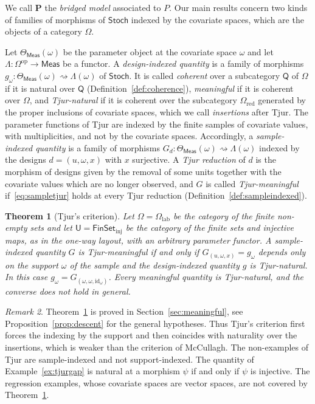 \documentclass[11pt,a4paper]{article}
\theoremstyle{plain}
\newtheorem{theorem}{Theorem}[section]
\theoremstyle{definition}
\theoremstyle{remark}
\newtheorem{remark}[theorem]{Remark}
\newcommand{\cat}[1]{\mathsf{#1}}
\newcommand{\catU}{\cat{U}}
\newcommand{\catO}{\cat{\Omega}}
\newcommand{\Meas}{\cat{Meas}}
\newcommand{\Stoch}{\cat{Stoch}}
\newcommand{\FinSet}{\cat{FinSet}}
\newcommand{\op}{\mathrm{op}}
\newcommand{\id}{\mathrm{id}}
\begin{document}
We call $\mathbf{P}$ the \emph{bridged model} associated to $P$. Our main
results concern two kinds of families of morphisms of $\Stoch$ indexed by the
covariate spaces, which are the objects of a category $\catO$.

Let $\Theta_\Meas(\omega)$ be the parameter object at the covariate space
$\omega$ and let $\Lambda \colon \catO^{\op} \to \Meas$ be a functor. A
\emph{design-indexed quantity} is a family of morphisms
$g_{\omega} \colon \Theta_\Meas(\omega) \rightsquigarrow \Lambda(\omega)$ of
$\Stoch$. It is called \emph{coherent} over a subcategory $\cat{Q}$ of $\catO$
if it is natural over $\cat{Q}$ (Definition~\ref{def:coherence}),
\emph{meaningful} if it is coherent over $\catO$, and \emph{Tjur-natural} if it
is coherent over the subcategory $\catO_{\mathrm{red}}$ generated by the proper
inclusions of covariate spaces, which we call \emph{insertions} after Tjur.
The parameter functions of Tjur are indexed by the finite samples of covariate
values, with multiplicities, and not by the covariate spaces. Accordingly, a
\emph{sample-indexed quantity} is a family of morphisms
$G_{d} \colon \Theta_\Meas(\omega) \rightsquigarrow \Lambda(\omega)$ indexed
by the designs $d = (u,\omega,x)$ with $x$ surjective. A \emph{Tjur reduction}
of $d$ is the morphism of designs given by the removal of some units together
with the covariate values which are no longer observed, and $G$ is called
\emph{Tjur-meaningful} if~\eqref{eq:sampletjur} holds at every Tjur reduction
(Definition~\ref{def:sampleindexed}).

\begin{theorem}[Tjur's criterion]\label{thm:main-tjur}
Let $\catO = \catO_{\mathrm{lab}}$ be the category of the finite non-empty
sets and let $\catU = \FinSet_{\mathrm{inj}}$ be the category of the finite
sets and injective maps, as in the one-way layout, with an arbitrary parameter
functor. A sample-indexed quantity $G$ is
Tjur-meaningful if and only if
$G_{(u,\omega,x)} = g_{\omega}$ depends only on the support $\omega$ of the
sample and the design-indexed quantity $g$ is Tjur-natural. In this case
$g_{\omega} = G_{(\omega,\omega,\id_{\omega})}$. Every meaningful quantity is
Tjur-natural, and the converse does not hold in general.
\end{theorem}

\begin{remark}\label{rem:main-tjur}
Theorem~\ref{thm:main-tjur} is proved in Section~\ref{sec:meaningful}, see
Proposition~\ref{prop:descent} for the general hypotheses. Thus Tjur's
criterion first forces the indexing by the support and then coincides with
naturality over the insertions, which is weaker than the criterion of
McCullagh. The non-examples of Tjur are sample-indexed and not
support-indexed. The quantity of Example~\ref{ex:tjurgap} is natural at a
morphism $\psi$ if and only if $\psi$ is injective. The regression examples,
whose covariate spaces are vector spaces, are not covered by
Theorem~\ref{thm:main-tjur}.
\end{remark}
\end{document}

